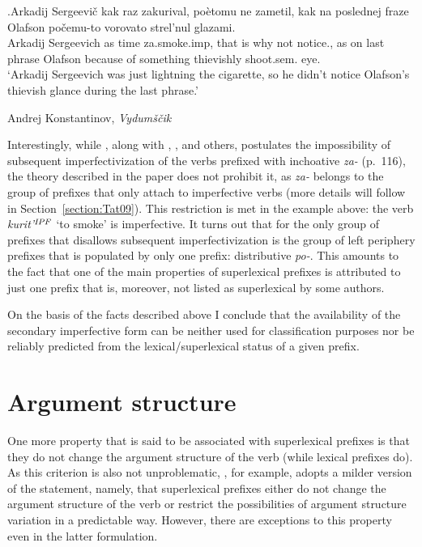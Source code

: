 \exg.\label{ex:zakurivat2}Arkadij Sergeevi\v{c} kak raz zakurival, po\`{e}tomu ne zametil, kak na poslednej fraze Olafson po\v{c}emu-to vorovato strel'nul glazami.\\
Arkadij Sergeevich as time za.smoke.imp, {that is why} not notice., as on last phrase Olafson {because of something} thievishly shoot.sem. eye.\\
\vspace{0.5em}
`Arkadij Sergeevich was just lightning the cigarette, so he didn't notice Olafson's thievish glance during the last phrase.'
\begin{flushright}
\vspace{-1em}
Andrej Konstantinov, \textit{Vydum\v{s}\v{c}ik}\\
\end{flushright}

Interestingly, while \citet{Tatevosov:09}, along with \citet{Svenonius:04b}, \citet{Ramchand:04}, and others, postulates the impossibility of subsequent imperfectivization of the verbs prefixed with inchoative \textit{za-} (p.~116), the theory described in the paper does not prohibit it, as \textit{za-} belongs to the group of prefixes that only attach to imperfective verbs (more details will follow in Section~\ref{section:Tat09}). This restriction is met in the example above: the verb \textit{kurit'}$^{\mathit{IPF}}$ `to smoke' is imperfective. It turns out that for \citet{Tatevosov:09} the only group of prefixes that disallows subsequent imperfectivization is the group of left periphery prefixes that is populated by only one prefix: distributive \textit{po-}. This amounts to the fact that one of the main properties of superlexical prefixes is attributed to just one prefix that is, moreover, not listed as superlexical by some authors.

On the basis of the facts described above I conclude that the availability of the secondary imperfective form can be neither used for classification purposes nor be reliably predicted from the lexical/superlexical status of a given prefix.

\section{Argument structure}\label{section:new:argstructure}
One more property that is said to be associated with superlexical prefixes is that they do not change the argument structure of the verb (while lexical prefixes do). As this criterion is also not unproblematic, \citet[116]{Tatevosov:09}, for example, adopts a milder version of the statement, namely, that superlexical prefixes either do not change the argument structure of the verb or restrict the possibilities of argument structure variation in a predictable way. However, there are exceptions to this property even in the latter formulation. 

